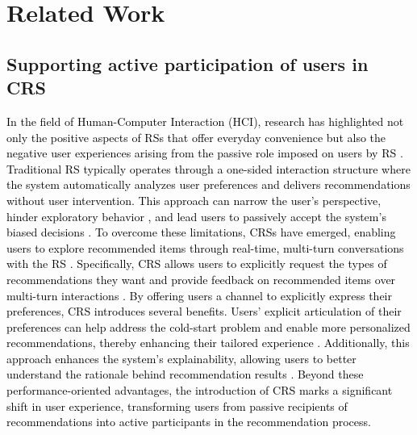 \section{Related Work}
\subsection{Supporting active participation of users in CRS}

\textcolor{black}{In the field of Human-Computer Interaction (HCI), research has highlighted not only the positive aspects of RSs that offer everyday convenience but also the negative user experiences arising from the passive role imposed on users by RS \cite{eslami2019user, sullivan2019reading}. Traditional RS typically operates through a one-sided interaction structure where the system automatically analyzes user preferences and delivers recommendations without user intervention. This approach can narrow the user’s perspective, hinder exploratory behavior \cite{wilkinson2018testing, pariser2011filter, guesmi2022interactive, chu2020towards}, and lead users to passively accept the system's biased decisions \cite{wilkinson2018testing, lee2015personalization, knijnenburg2016recommender}. To overcome these limitations, CRSs have emerged, enabling users to explore recommended items through real-time, multi-turn conversations with the RS \cite{cai2022impacts, bursztyn2021developing, cai2020predicting}. Specifically, CRS allows users to explicitly request the types of recommendations they want \cite{cai2022impacts, friedman2023leveraging, jannach2021survey, zhu2024reliable} and provide feedback on recommended items over multi-turn interactions \cite{jin2019musicbot}. By offering users a channel to explicitly express their preferences, CRS introduces several benefits. Users’ explicit articulation of their preferences can help address the cold-start problem \cite{li2023exploring, zhai2024actions, dai2023uncovering, di2023evaluating, sanner2023large, jannach2021survey} and enable more personalized recommendations, thereby enhancing their tailored experience \cite{zhu2024reliable}. Additionally, this approach enhances the system's explainability, allowing users to better understand the rationale behind recommendation results \cite{li2023large, liu2023chatgpt, lubos2024llm, silva2024leveraging, gao2024generative}. Beyond these performance-oriented advantages, the introduction of CRS marks a significant shift in user experience, transforming users from passive recipients of recommendations into active participants in the recommendation process. }


